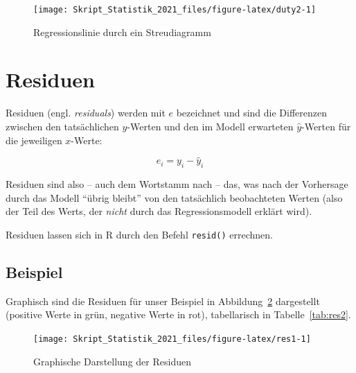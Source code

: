 \documentclass[
  11pt,
  ngerman,
  a4paper,
]{report}
\newenvironment{rtip}{
  \medskip
  \begin{tcolorbox}[colframe=purple,colback=light_gray,title=Softwarehinweis]
}{
  \end{tcolorbox}
  \medskip
}
\begin{document}
\begin{figure}[!h]

{\centering \texttt{[image: Skript\_Statistik\_2021\_files/figure-latex/duty2-1]} 

}

\caption{Regressionslinie durch ein Streudiagramm}\label{fig:duty2}
\end{figure}

\hypertarget{residuen}{%
\section{Residuen}\label{residuen}}

Residuen (engl. \emph{residuals}) werden mit \(e\) bezeichnet und sind die Differenzen zwischen den tatsächlichen \(y\)-Werten und den im Modell erwarteten \(\hat{y}\)-Werten für die jeweiligen \(x\)-Werte:

\nopagebreak

\[
e_i=y_i-\hat{y}_i
\label{eq:res}
\]

Residuen sind also -- auch dem Wortstamm nach -- das, was nach der Vorhersage durch das Modell \enquote{übrig bleibt} von den tatsächlich beobachteten Werten (also der Teil des Werts, der \emph{nicht} durch das Regressionsmodell erklärt wird).

\begin{rtip}
Residuen lassen sich in R durch den Befehl \verb|resid()| errechnen.
\end{rtip}

\hypertarget{beispiel-27}{%
\subsection{Beispiel}\label{beispiel-27}}

Graphisch sind die Residuen für unser Beispiel in Abbildung~\ref{fig:res1} dargestellt (positive Werte in grün, negative Werte in rot), tabellarisch in Tabelle~\ref{tab:res2}.

\begin{figure}[!h]

{\centering \texttt{[image: Skript\_Statistik\_2021\_files/figure-latex/res1-1]} 

}

\caption{Graphische Darstellung der Residuen}\label{fig:res1}
\end{figure}
\end{document}
